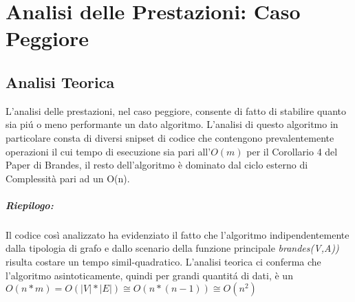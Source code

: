 \chapter{Analisi delle Prestazioni: Caso Peggiore}%
\section{Analisi Teorica}
L'analisi delle prestazioni, nel caso peggiore, consente di fatto di stabilire quanto sia pi\'u o meno performante un dato algoritmo. L'analisi di questo algoritmo in particolare consta di diversi snipset di codice che contengono prevalentemente operazioni il cui tempo di esecuzione sia pari all'$O(m)$ per il Corollario 4 del Paper di Brandes, il resto dell'algoritmo è dominato dal ciclo esterno di Complessità pari ad un O(n).
\newline
\newline


\newline 
\newpage




\paragraph{Riepilogo:}
	Il codice così analizzato ha evidenziato il fatto che l'algoritmo indipendentemente dalla tipologia di grafo e dallo scenario della funzione principale \emph{brandes(V,A))} risulta costare un tempo simil-quadratico. L'analisi teorica ci conferma che l'algoritmo asintoticamente, quindi per grandi quantit\'a di dati, è un $O(n*m) = O(|V|*|E|) \cong O(n*(n-1)) \cong O(n^2)$

